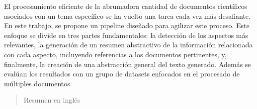 \begin{resumen}
	El procesamiento eficiente de la abrumadora cantidad de documentos científicos asociados con un tema específico se ha vuelto una tarea cada vez más desafiante. En este trabajo, se propone un pipeline diseñado para agilizar este proceso. Este enfoque se divide en tres partes fundamentales: la detección de los aspectos más relevantes, la generación de un resumen abstractivo de la información relacionada con cada aspecto, incluyendo referencias a los documentos pertinentes, y, finalmente, la creación de una abstracción general del texto generado. Además se evalúan los resultados con un grupo de datasets enfocados en el procesado de múltiples documentos. 
\end{resumen}

\begin{abstract}
	Resumen en inglés
\end{abstract}